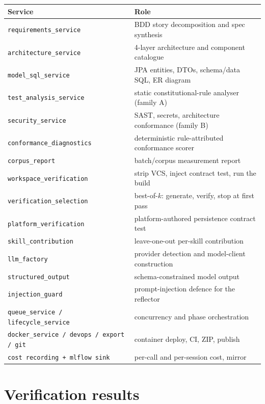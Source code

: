 \documentclass[11pt,a4paper]{article}
\begin{document}
\begin{center}
\begin{longtable}{@{}p{}p{}@{}}
\toprule
\textbf{Service} & \textbf{Role} \\
\midrule
\texttt{requirements\_service} & BDD story decomposition and spec synthesis \\
\texttt{architecture\_service} & 4-layer architecture and component catalogue \\
\texttt{model\_sql\_service} & JPA entities, DTOs, schema/data SQL, ER diagram \\
\texttt{test\_analysis\_service} & static constitutional-rule analyser (family A) \\
\texttt{security\_service} & SAST, secrets, architecture conformance (family B) \\
\texttt{conformance\_diagnostics} & deterministic rule-attributed conformance scorer \\
\texttt{corpus\_report} & batch/corpus measurement report \\
\texttt{workspace\_verification} & strip VCS, inject contract test, run the build \\
\texttt{verification\_selection} & best-of-$k$: generate, verify, stop at first pass \\
\texttt{platform\_verification} & platform-authored persistence contract test \\
\texttt{skill\_contribution} & leave-one-out per-skill contribution \\
\texttt{llm\_factory} & provider detection and model-client construction \\
\texttt{structured\_output} & schema-constrained model output \\
\texttt{injection\_guard} & prompt-injection defence for the reflector \\
\texttt{queue\_service / lifecycle\_service} & concurrency and phase orchestration \\
\texttt{docker\_service / devops / export / git} & container deploy, CI, ZIP, publish \\
\texttt{cost recording + mlflow sink} & per-call and per-session cost, mirror \\
\bottomrule
\end{longtable}
\end{center}

\section{Verification results}
\label{sec:verification}
\end{document}
